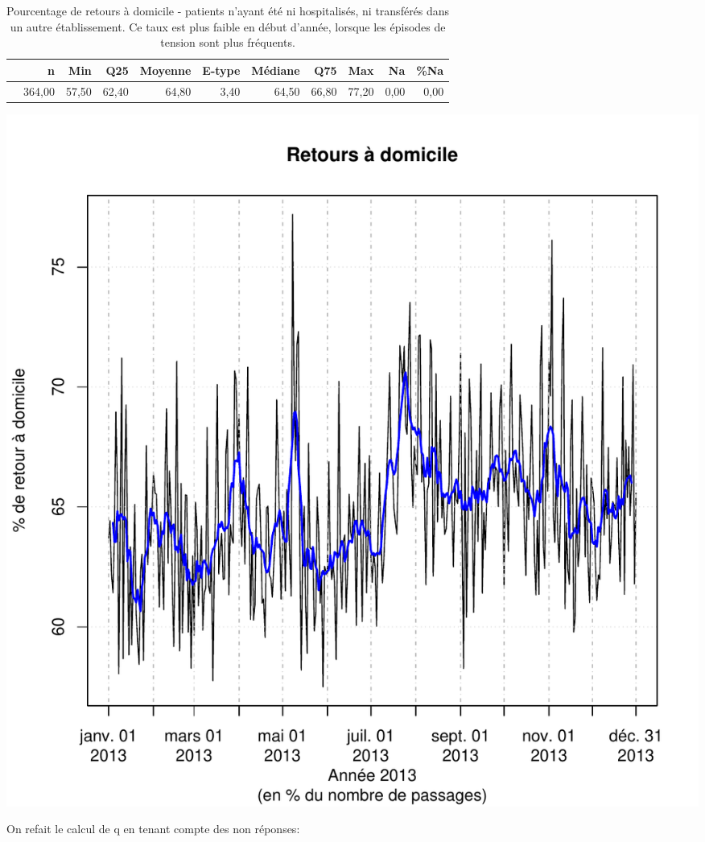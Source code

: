 \documentclass[12pt,english,french,twoside]{book}\usepackage[]{graphicx}\usepackage[]{color}
\makeatletter
\def\maxwidth{ %
  \ifdim\Gin@nat@width>\linewidth
    \linewidth
  \else
    \Gin@nat@width
  \fi
}
\makeatother
\begin{document}
\begin{table}[ht]
\centering
\begin{tabular}{rrrrrrrrrrr}
  \hline
 & n & Min & Q25 & Moyenne & E-type & Médiane & Q75 & Max & Na & \%Na \\ 
  \hline
 & 364,00 & 57,50 & 62,40 & 64,80 & 3,40 & 64,50 & 66,80 & 77,20 & 0,00 & 0,00 \\ 
   \hline
\end{tabular}
\caption[Retour à domicile]{Pourcentage de retours à domicile - patients n'ayant été ni hospitalisés, ni transférés dans un autre établissement. Ce taux est plus faible en début d'année, lorsque les épisodes de tension sont plus fréquents.} 
\label{tab:rd}
\end{table}

\includegraphics[width=\maxwidth]{figure/retour_dom-1} 


On refait le calcul de q en tenant compte des non réponses:
\end{document}
